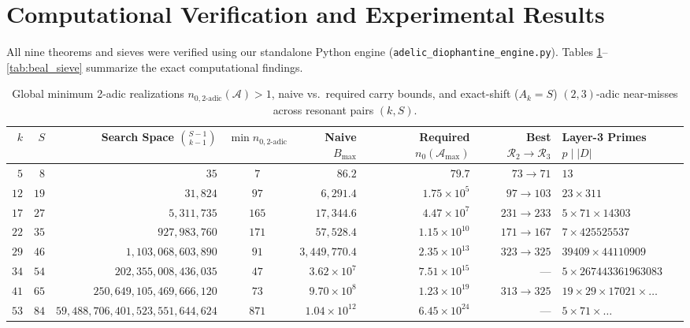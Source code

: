 \documentclass[11pt, a4paper]{amsart}
\theoremstyle{definition}
\newcommand{\A}{\mathcal{A}}
\newcommand{\Rcal}{\mathcal{R}}
\begin{document}
\section{Computational Verification and Experimental Results}

All nine theorems and sieves were verified using our standalone Python engine (\texttt{adelic\_diophantine\_engine.py}). Tables \ref{tab:collatz_min}--\ref{tab:beal_sieve} summarize the exact computational findings.

\begin{table}[htbp]
\centering
\caption{Global minimum 2-adic realizations $n_{0,\text{2-adic}}(\A) > 1$, naive vs.\ required carry bounds, and exact-shift ($A_k = S$) $(2,3)$-adic near-misses across resonant pairs $(k, S)$.}
\label{tab:collatz_min}
\footnotesize
\begin{tabular}{@{}rrrcrrrl@{}}
\toprule
$k$ & $S$ & Search Space $\binom{S-1}{k-1}$ & $\min n_{0,\text{2-adic}}$ & Naive $B_{\max}$ & Required $n_0(\A_{\max})$ & Best $\Rcal_2 \to \Rcal_3$ & Layer-3 Primes $p \mid |D|$ \\
\midrule
$5$  & $8$  & $35$                             & $7$   & $86.2$                & $79.7$                & $73 \to 71$   & $13$ \\
$12$ & $19$ & $31,824$                         & $97$  & $6,291.4$             & $1.75 \times 10^5$    & $97 \to 103$  & $23 \times 311$ \\
$17$ & $27$ & $5,311,735$                      & $165$ & $17,344.6$            & $4.47 \times 10^7$    & $231 \to 233$ & $5 \times 71 \times 14303$ \\
$22$ & $35$ & $927,983,760$                    & $171$ & $57,528.4$            & $1.15 \times 10^{10}$ & $171 \to 167$ & $7 \times 425525537$ \\
$29$ & $46$ & $1,103,068,603,890$              & $91$  & $3,449,770.4$         & $2.35 \times 10^{13}$ & $323 \to 325$ & $39409 \times 44110909$ \\
$34$ & $54$ & $202,355,008,436,035$            & $47$  & $3.62 \times 10^7$    & $7.51 \times 10^{15}$ & ---           & $5 \times 267443361963083$ \\
$41$ & $65$ & $250,649,105,469,666,120$        & $73$  & $9.70 \times 10^8$    & $1.23 \times 10^{19}$ & $313 \to 325$ & $19 \times 29 \times 17021 \times \dots$ \\
$53$ & $84$ & $59,488,706,401,523,551,644,624$ & $871$ & $1.04 \times 10^{12}$ & $6.45 \times 10^{24}$ & ---           & $5 \times 71 \times \dots$ \\
\bottomrule
\end{tabular}
\end{table}
\end{document}
